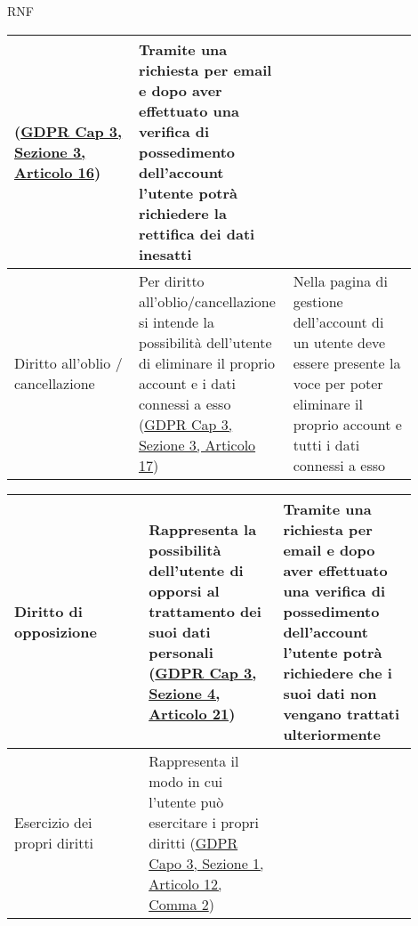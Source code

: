 \begin{listaPersonale}{RNF}
\begin{tabular}{|p{0.3\linewidth}|p{0.3\linewidth}|p{0.3\linewidth}|}
        (\href{https://eur-lex.europa.eu/legal-content/IT/TXT/?uri=uriserv:OJ.L_.2016.119.01.0001.01.ITA                                          & toc=OJ:L:2016:119:TOC#d1e2606-1-1}{GDPR Cap 3, Sezione 3, Articolo 16})  &
        Tramite una richiesta per email e dopo aver effettuato una
        verifica di possedimento dell'account l'utente potrà
        richiedere la rettifica dei dati inesatti                                                                                                                                                                              \\
        \hline
        Diritto all'oblio / cancellazione                                                                                                         &
        Per diritto all'oblio/cancellazione si intende la possibilità
        dell'utente di eliminare il
        proprio account e i dati connessi a esso (\href{https://eur-lex.europa.eu/legal-content/IT/TXT/?uri=uriserv:OJ.L_.2016.119.01.0001.01.ITA & toc=OJ:L:2016:119:TOC#d1e2613-1-1}{GDPR Cap 3, Sezione 3, Articolo 17})  &
        Nella pagina di gestione dell'account di un utente deve essere
        presente la voce per poter eliminare il proprio account e
        tutti i dati connessi a esso                                                                                                                                                                                           \\
        \hline
    \end{tabular}
    \newpage
    \begin{tabular}{|p{0.3\linewidth}|p{0.3\linewidth}|p{0.3\linewidth}|}
        \hline
        Diritto di opposizione                               &
        Rappresenta la possibilità dell'utente di opporsi al trattamento dei suoi
        dati personali (\href{https://eur-lex.europa.eu/legal-content/IT/TXT/?uri=uriserv:OJ.L_.2016.119.01.0001.01.ITA&toc=OJ:L:2016:119:TOC#d1e2810-1-1}{GDPR Cap 3, Sezione 4, Articolo 21}) &
        Tramite una richiesta per email e dopo aver effettuato una verifica di
        possedimento dell'account l'utente potrà richiedere che i suoi dati
        non vengano trattati ulteriormente                                   \\
        \hline
        Esercizio dei propri diritti                         &
        Rappresenta il modo in cui l'utente può esercitare i propri diritti
        (\href{https://eur-lex.europa.eu/legal-content/IT/TXT/?uri=uriserv:OJ.L_.2016.119.01.0001.01.ITA&toc=OJ:L:2016:119:TOC#d1e2189-1-1}{GDPR Capo 3, Sezione 1, Articolo 12, Comma 2})       &

\end{tabular}
\end{listaPersonale}
